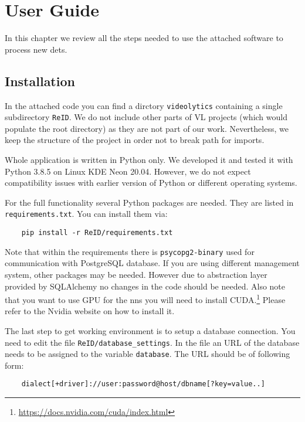 \chapter{User Guide}

\label{ch:guide}

In this chapter we review all the steps needed to use the attached software to process new \glspl{det}.

\section{Installation}

In the attached code you can find a dirctory \texttt{videolytics} containing a single subdirectory \texttt{ReID}. We do not include other parts of \gls{VL} projects (which would populate the root directory) as they are not part of our work. Nevertheless, we keep the structure of the project in order not to break path for imports.

Whole application is written in Python only. We developed it and tested it with Python 3.8.5 on Linux KDE Neon 20.04. However, we do not expect compatibility issues with earlier version of Python or different operating systems.

For the full functionality several Python packages are needed. They are listed in \texttt{requirements.txt}. You can install them via:

\begin{verbatim}
    pip install -r ReID/requirements.txt
\end{verbatim}

Note that within the requirements there is \verb+psycopg2-binary+ used for communication with PostgreSQL database. If you are using different management system, other packages may be needed. However due to abstraction layer provided by SQLAlchemy no changes in the code should be needed. Also note that you want to use GPU for the \glspl{nn} you will need to install CUDA.\footnote{\url{https://docs.nvidia.com/cuda/index.html}} Please refer to the Nvidia website on how to install it.

The last step to get working environment is to setup a database connection. You need to edit the file \texttt{ReID/database\_settings}. In the file an URL of the database needs to be assigned to the variable \verb+database+. The URL should be of following form:

\begin{verbatim}
    dialect[+driver]://user:password@host/dbname[?key=value..]
\end{verbatim}

